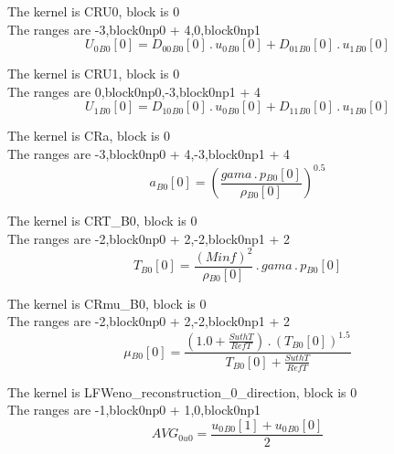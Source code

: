 \documentclass{article}
\begin{document}
\noindent The kernel is CRU0, block is 0\\\noindent The ranges are -3,block0np0 + 4,0,block0np1\\\begin{dmath}{U_{0}{_{B0}}}[{0}] = {D_{00}{_{B0}}}[{0}] \,.\, {u_{0}{_{B0}}}[{0}] + {D_{01}{_{B0}}}[{0}] \,.\, {u_{1}{_{B0}}}[{0}]\end{dmath}

\noindent The kernel is CRU1, block is 0\\\noindent The ranges are 0,block0np0,-3,block0np1 + 4\\\begin{dmath}{U_{1}{_{B0}}}[{0}] = {D_{10}{_{B0}}}[{0}] \,.\, {u_{0}{_{B0}}}[{0}] + {D_{11}{_{B0}}}[{0}] \,.\, {u_{1}{_{B0}}}[{0}]\end{dmath}

\noindent The kernel is CRa, block is 0\\\noindent The ranges are -3,block0np0 + 4,-3,block0np1 + 4\\\begin{dmath}{a{_{B0}}}[{0}] = \left(\frac{gama \,.\, {p{_{B0}}}[{0}]}{{\rho{_{B0}}}[{0}]} \right)^{0.5}\end{dmath}

\noindent The kernel is CRT_B0, block is 0\\\noindent The ranges are -2,block0np0 + 2,-2,block0np1 + 2\\\begin{dmath}{T{_{B0}}}[{0}] = \frac{\left(Minf \right)^{2}}{{\rho{_{B0}}}[{0}]} \,.\, gama \,.\, {p{_{B0}}}[{0}]\end{dmath}

\noindent The kernel is CRmu_B0, block is 0\\\noindent The ranges are -2,block0np0 + 2,-2,block0np1 + 2\\\begin{dmath}{\mu{_{B0}}}[{0}] = \frac{\left(1.0 + \frac{SuthT}{RefT}\right) \,.\, \left({T{_{B0}}}[{0}] \right)^{1.5}}{{T{_{B0}}}[{0}] + \frac{SuthT}{RefT}}\end{dmath}

\noindent The kernel is LFWeno_reconstruction_0_direction, block is 0\\\noindent The ranges are -1,block0np0 + 1,0,block0np1\\\begin{dmath}AVG_{0 u0} = \frac{{u_{0}{_{B0}}}[{1}] + {u_{0}{_{B0}}}[{0}]}{2}\end{dmath}
\end{document}

